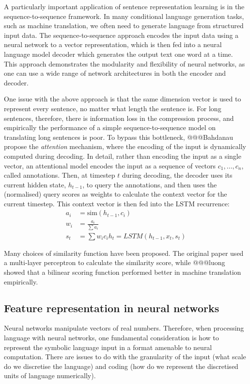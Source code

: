A particularly important application of sentence representation learning is in the sequence-to-sequence framework. In many conditional language generation tasks, such as machine translation, we often need to generate language from structured input data. The sequence-to-sequence approach encodes the input data using a neural network to a vector representation, which is then fed into a neural language model decoder which generates the output text one word at a time. This approach demonstrates the modularity and flexibility of neural networks, as one can use a wide range of network architectures in both the encoder and decoder.

One issue with the above approach is that the same dimension vector is used to represent every sentence, no matter what length the sentence is. For long sentences, therefore, there is information loss in the compression process, and empirically the performance of a simple sequence-to-sequence model on translating long sentences is poor. To bypass this bottleneck, @@@Bahdanau propose the \textit{attention} mechanism, where the encoding of the input is dynamically computed during decoding. In detail, rather than encoding the input as a single vector, an attentional model encodes the input as a sequence of vectors $c_1, \dots, c_n$, called annotations. Then, at timestep $t$ during decoding, the decoder uses its current hidden state, $h_{t-1}$, to query the annotations, and then uses the (normalised) query scores as weights to calculate the context vector for the current timestep. This context vector is then fed into the LSTM recurrence:
\begin{align}
    a_i &= \text{sim}(h_{t-1}, c_i) \\
    w_i &= \frac{a_i}{\sum a_i} \\
    s_t &= \sum w_i c_i
    h_t = LSTM(h_{t-1}, x_t, s_t)
\end{align}

Many choices of similarity function have been proposed. The original paper used a multi-layer perceptron to calculate the similarity score, while @@@luong showed that a bilinear scoring function performed better in machine translation empirically.

\subsection{Feature representation in neural networks}

Neural networks manipulate vectors of real numbers. Therefore, when processing language with neural networks, one fundamental consideration is how to represent the symbolic language input in a format amenable to neural computation. There are issues to do with the granularity of the input (what scale do we discretise the language) and coding (how do we represent the discretised units of language numerically).

